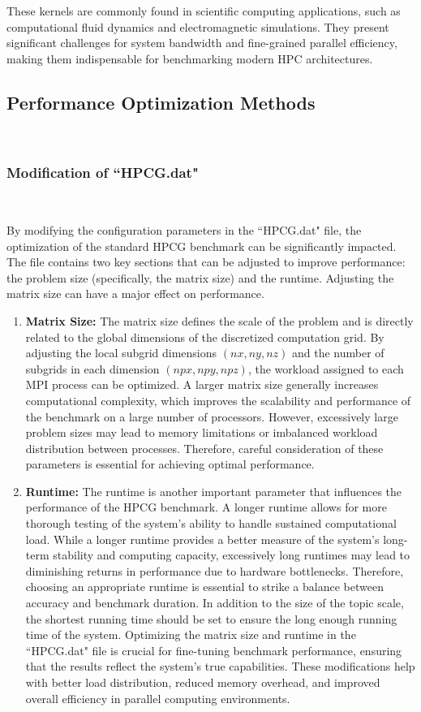 These kernels are commonly found in scientific computing applications, such as computational fluid dynamics and electromagnetic simulations. 
They present significant challenges for system bandwidth and fine-grained parallel efficiency, making them indispensable for benchmarking modern HPC architectures.

\subsection{Performance Optimization Methods}
\ 

\subsubsection{Modification of ``HPCG.dat"}
\ 

By modifying the configuration parameters in the ``HPCG.dat" file, the optimization of the standard HPCG benchmark can be significantly impacted. 
The file contains two key sections that can be adjusted to improve performance: the problem size (specifically, the matrix size) and the runtime.
Adjusting the matrix size can have a major effect on performance.   

\begin{enumerate}
    \item \textbf{Matrix Size:} The matrix size defines the scale of the problem and is directly related to the global dimensions of the discretized computation grid. 
    By adjusting the local subgrid dimensions $(nx, ny, nz)$ and the number of subgrids in each dimension $(npx, npy, npz)$, the workload assigned to each MPI process can be optimized. 
    A larger matrix size generally increases computational complexity, which improves the scalability and performance of the benchmark on a large number of processors. 
    However, excessively large problem sizes may lead to memory limitations or imbalanced workload distribution between processes.
    Therefore, careful consideration of these parameters is essential for achieving optimal performance.
    \item \textbf{Runtime:} The runtime is another important parameter that influences the performance of the HPCG benchmark. 
    A longer runtime allows for more thorough testing of the system’s ability to handle sustained computational load. While a longer runtime provides a better measure of the system’s long-term stability and computing capacity, excessively long runtimes may lead to diminishing returns in performance due to hardware bottlenecks. 
    Therefore, choosing an appropriate runtime is essential to strike a balance between accuracy and benchmark duration. 
    In addition to the size of the topic scale, the shortest running time should be set to ensure the long enough running time of the system.
    Optimizing the matrix size and runtime in the ``HPCG.dat" file is crucial for fine-tuning benchmark performance, ensuring that the results reflect the system’s true capabilities.
    These modifications help with better load distribution, reduced memory overhead, and improved overall efficiency in parallel computing environments.
\end{enumerate}




